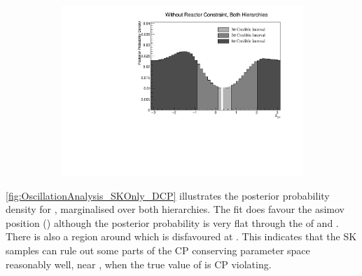 \begin{figure}[h]
  \begin{subfigure}[t]{1.0\textwidth}
    \includegraphics[width=\textwidth, trim={0mm 0mm 0mm 0mm}, clip,page=1]{Figures/OA/SKOnlyFit/Contours_1D_dcp_BH_1_woRC_UnSmeared_CredibleInterval.pdf}
  \end{subfigure}
  \caption{}
  \label{fig:OscillationAnalysis_SKOnly_DCP}
\end{figure}

\autoref{fig:OscillationAnalysis_SKOnly_DCP} illustrates the posterior probability density for , marginalised over both hierarchies. The fit does favour the asimov position () although the posterior probability is very flat through the of  and . There is also a region around  which is disfavoured at \quickmath{2\sigma}. This indicates that the SK samples can rule out some parts of the CP conserving parameter space reasonably well, near , when the true value of  is CP violating. 

